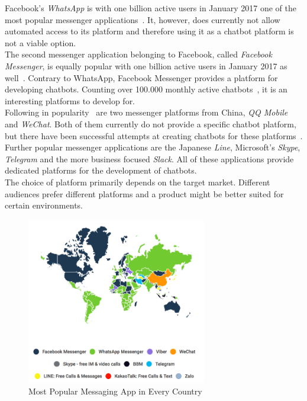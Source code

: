Facebook's \emph{WhatsApp} is with one billion active users in January 2017 one of the most popular messenger applications~\cite{fbpopular}.
It, however, does currently not allow automated access to its platform and therefore using it as a chatbot platform is not a viable option.
\\

The second messenger application belonging to Facebook, called \emph{Facebook Messenger}, is equally popular with one billion active users in January 2017 as well~\cite{fbpopular}.
Contrary to WhatsApp, Facebook Messenger provides a platform for developing chatbots.
Counting over 100.000 monthly active chatbots~\cite{messenger}, it is an interesting platforms to develop for.
\\

Following in popularity~\cite{appusage} are two messenger platforms from China, \emph{QQ Mobile} and \emph{WeChat}.
Both of them currently do not provide a specific chatbot platform,
but there have been successful attempts at creating chatbots for these platforms~\cite{wechatbot}.
\\

Further popular messenger applications are the Japanese \emph{Line}, Microsoft's \emph{Skype}, \emph{Telegram} and the more business focused \emph{Slack}.
All of these applications provide dedicated platforms for the development of chatbots.
\\

The choice of platform primarily depends on the target market.
Different audiences prefer different platforms and a product might be better suited for certain environments.

\begin{figure}[H]
	\centering
	\includegraphics[width=0.7\textwidth]{images/similarweb-messenger-by-country.png}
	\caption{Most Popular Messaging App in Every Country~\cite{similarweb}}
	\label{fig:similarweb}
\end{figure}

